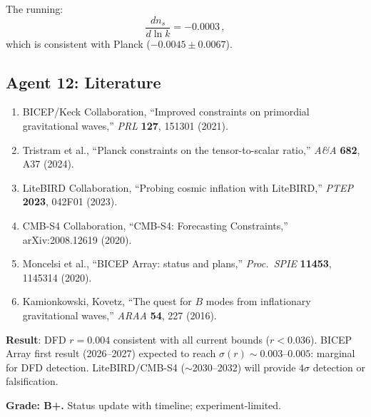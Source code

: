 \documentclass[11pt,a4paper]{article}
\begin{document}
The running:
\begin{equation}
\frac{dn_s}{d\ln k} = -0.0003\,,
\end{equation}
which is consistent with Planck ($-0.0045 \pm 0.0067$).

\subsection{Agent 12: Literature}

\begin{enumerate}
\item BICEP/Keck Collaboration, ``Improved constraints on primordial gravitational waves,'' \textit{PRL} \textbf{127}, 151301 (2021).
\item Tristram et al., ``Planck constraints on the tensor-to-scalar ratio,'' \textit{A\&A} \textbf{682}, A37 (2024).
\item LiteBIRD Collaboration, ``Probing cosmic inflation with LiteBIRD,'' \textit{PTEP} \textbf{2023}, 042F01 (2023).
\item CMB-S4 Collaboration, ``CMB-S4: Forecasting Constraints,'' arXiv:2008.12619 (2020).
\item Moncelsi et al., ``BICEP Array: status and plans,'' \textit{Proc.\ SPIE} \textbf{11453}, 1145314 (2020).
\item Kamionkowski, Kovetz, ``The quest for $B$ modes from inflationary gravitational waves,'' \textit{ARAA} \textbf{54}, 227 (2016).
\end{enumerate}

\begin{tcolorbox}[colback=yellow!10!white, colframe=yellow!60!black, title={Agent 12: $B$-Mode --- Remains YELLOW (Experiment-Limited)}]
\textbf{Result}: DFD $r = 0.004$ consistent with all current bounds ($r < 0.036$). BICEP Array first result (2026--2027) expected to reach $\sigma(r) \sim 0.003$--$0.005$: marginal for DFD detection. LiteBIRD/CMB-S4 ($\sim$2030--2032) will provide $4\sigma$ detection or falsification.

\textbf{Grade: B+.} Status update with timeline; experiment-limited.
\end{tcolorbox}
\end{document}
